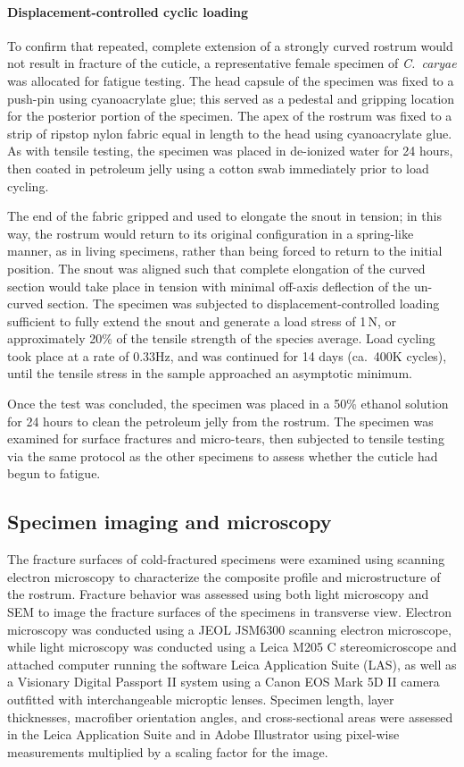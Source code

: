 \documentclass[twocolumn, linenumbers, superscriptaddress, nofootinbib]{revtex4-1}
\begin{document}
			\paragraph*{Displacement-controlled cyclic loading}
				To confirm that repeated, complete extension of a strongly curved rostrum would not result in fracture of the cuticle, a representative female specimen of \textit{C.~caryae} was allocated for fatigue testing.
				The head capsule of the specimen was fixed to a push-pin using cyanoacrylate glue; this served as a pedestal and gripping location for the posterior portion of the specimen.
				The apex of the rostrum was fixed to a strip of ripstop nylon fabric equal in length to the head using cyanoacrylate glue.
				As with tensile testing, the specimen was placed in de-ionized water for 24 hours, then coated in petroleum jelly using a cotton swab immediately prior to load cycling.
				
				The end of the fabric gripped and used to elongate the snout in tension; in this way, the rostrum would return to its original configuration in a spring-like manner, as in living specimens, rather than being forced to return to the initial position.
				The snout was aligned such that complete elongation of the curved section would take place in tension with minimal off-axis deflection of the un-curved section.
				The specimen was subjected to displacement-controlled loading sufficient to fully extend the snout and generate a load stress of 1\,N, or approximately 20\% of the tensile strength of the species average.
				Load cycling took place at a rate of 0.33Hz, and was continued for 14 days (ca.~400K cycles), until the tensile stress in the sample approached an asymptotic minimum.
				
				Once the test was concluded, the specimen was placed in a 50\% ethanol solution for 24 hours to clean the petroleum jelly from the rostrum.
				The specimen was examined for surface fractures and micro-tears, then subjected to tensile testing via the same protocol as the other specimens to assess whether the cuticle had begun to fatigue.
		
		\subsection*{Specimen imaging and microscopy}
			The fracture surfaces of cold-fractured specimens were examined using scanning electron microscopy to characterize the composite profile and microstructure of the rostrum.
			Fracture behavior was assessed using both light microscopy and SEM to image the fracture surfaces of the specimens in transverse view.
			Electron microscopy was conducted using a JEOL JSM6300 scanning electron microscope, while light microscopy was conducted using a Leica M205 C stereomicroscope and attached	computer running the software Leica Application Suite (LAS), as well as a Visionary Digital Passport II system using a Canon EOS Mark 5D II camera outfitted with interchangeable microptic lenses.
			Specimen length, layer thicknesses, macrofiber orientation angles, and cross-sectional areas were assessed in the Leica Application Suite and in Adobe Illustrator using pixel-wise measurements multiplied by a scaling factor for the image.
			
\end{document}
